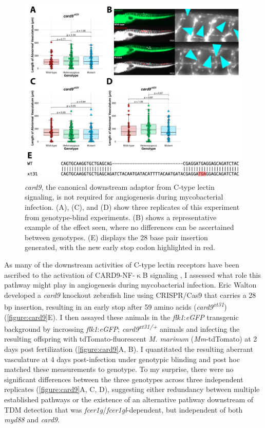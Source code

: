 \begin{figure}
\centering
\includegraphics[width=\textwidth]{images/card9.pdf}
\caption[\textit{card9} is dispensable for angiogenesis]{\textit{card9}, the canonical downstream adaptor from C\hyp{}type lectin signaling, is not required for angiogenesis during mycobacterial infection. (A), (C), and (D) show three replicates of this experiment from genotype\hyp{}blind experiments. (B) shows a representative example of the effect seen, where no differences can be ascertained between genotypes. (E) displays the 28 base pair insertion generated, with the new early stop codon highlighted in red.}
\label{figure:card9}
\end{figure}

As many of the downstream activities of C\hyp{}type lectin receptors have been ascribed to the activation of CARD9\hyp{}NF\hyp{}$\upkappa$B signaling \citep{Goodridge2009, LobatoPascual2013, Zhao2014, Williams2017, Deerhake2021}, I assessed what role this pathway might play in angiogenesis during mycobacterial infection. Eric Walton developed a \textit{card9} knockout zebrafish line using CRISPR/Cas9 that carries a 28 bp insertion, resulting in an early stop after 59 amino acids (\textit{card9\textsuperscript{xt31}}) (\autoref{figure:card9}E). I then assayed these animals in the \textit{flk1}:\textit{eGFP} transgenic background by incrossing \textit{flk1}:\textit{eGFP}; \textit{card9\textsuperscript{xt31/+}} animals and infecting the resulting offspring with tdTomato\hyp{}fluorescent \textit{M. marinum} (\textit{Mm}\hyp{}tdTomato) at 2 days post fertilization \citep{Jin2005, Oehlers2015}(\autoref{figure:card9}A, B). I quantitated the resulting aberrant vasculature at 4 days post\hyp{}infection under genotypic blinding and post hoc matched these measurements to genotype. To my surprise, there were no significant differences between the three genotypes across three independent replicates (\autoref{figure:card9}A, C, D), suggesting either redundancy between multiple established pathways or the existence of an alternative pathway downstream of TDM detection that was \textit{fcer1g}/\textit{fcer1gl}\hyp{}dependent, but independent of both \textit{myd88} and \textit{card9}. 

